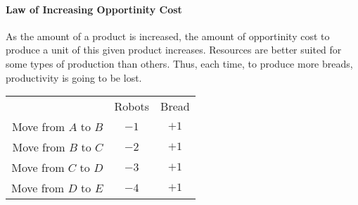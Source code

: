 \paragraph{Law of Increasing Opportinity Cost} As the amount of a product is increased, the amount of opportinity cost to produce a unit of this given product increases. Resources are better suited for some types of production than others. Thus, each time, to produce more breads, productivity is going to be lost.

\begin{center}
	\begin{tabular}{rcc}
							 & Robots & Bread \\
		Move from $A$ to $B$ & $-1$   & $+1$  \\
		Move from $B$ to $C$ & $-2$   & $+1$  \\
		Move from $C$ to $D$ & $-3$   & $+1$  \\
		Move from $D$ to $E$ & $-4$   & $+1$  \\
	\end{tabular}
\end{center}
